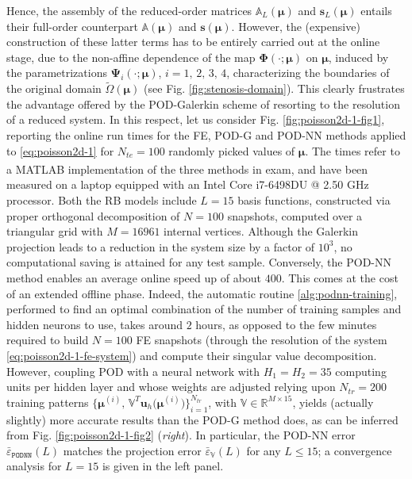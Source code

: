 \documentclass[12pt, a4paper, twoside, openright, notitlepage]{report}
\numberwithin{equation}{chapter}
\theoremstyle{theorem}
\theoremstyle{definition}
\theoremstyle{remark}
\theoremstyle{proposition}
\numberwithin{figure}{chapter}
\newcommand{\wt}[1]{\widetilde{#1}}
\newcommand{\bg}[1]{\boldsymbol{#1}}
\begin{document}
		Hence, the assembly of the reduced-order matrices $\mathbb{A}_L(\bg{\mu})$ and $\mathbf{s}_L(\bg{\mu})$ entails their full-order counterpart $\mathbb{A}(\bg{\mu})$ and $\mathbf{s}(\bg{\mu})$. However, the (expensive) construction of these latter terms has to be entirely carried out at the online stage, due to the non-affine dependence of the map $\bg{\Phi}(\cdot; \bg{\mu})$ on $\bg{\mu}$, induced by the parametrizations $\bg{\Psi}_i(\cdot; \bg{\mu})$, $i = 1, \, 2, \, 3, \, 4$, characterizing the boundaries of the original domain $\wt{\Omega}(\bg{\mu})$ (see Fig. \ref{fig:stenosis-domain}). This clearly frustrates the advantage offered by the POD-Galerkin scheme of resorting to the resolution of a reduced system. In this respect, let us consider Fig. \ref{fig:poisson2d-1-fig1}, reporting the online run times for the FE, POD-G and POD-NN methods applied to \eqref{eq:poisson2d-1} for $N_{te} = 100$ randomly picked values of $\bg{\mu}$. The times refer to a MATLAB\textsuperscript{\textregistered} implementation of the three methods in exam, and have been measured on a laptop equipped with an Intel Core i7-6498DU @ 2.50 GHz processor. Both the RB models include $L = 15$ basis functions, constructed via proper orthogonal decomposition of $N = 100$ snapshots, computed over a triangular grid with $M = 16961$ internal vertices. Although the Galerkin projection leads to a reduction in the system size by a factor of $10^3$, no computational saving is attained for any test sample. Conversely, the POD-NN method enables an average online speed up of about $400$. This comes at the cost of an extended offline phase. Indeed, the automatic routine \ref{alg:podnn-training}, performed to find an optimal combination of the number of training samples and hidden neurons to use, takes around $2$ hours, as opposed to the few minutes required to build $N = 100$ FE snapshots (through the resolution of the system \eqref{eq:poisson2d-1-fe-system}) and compute their singular value decomposition. However, coupling POD with a neural network with $H_1 = H_2 = 35$ computing units per hidden layer and whose weights are adjusted relying upon $N_{tr} = 200$ training patterns $\big\lbrace \bg{\mu}^{(i)}, \, \mathbb{V}^T \mathbf{u}_h \big( \bg{\mu}^{(i)} \big) \big\rbrace_{i = 1}^{N_{tr}}$, with $\mathbb{V} \in \mathbb{R}^{M \times 15}$, yields (actually slightly) more accurate results than the POD-G method does, as can be inferred from Fig. \ref{fig:poisson2d-1-fig2} (\emph{right}). In particular, the POD-NN error $\bar{\varepsilon}_{\texttt{PODNN}}^{}(L)$ matches the projection error $\bar{\varepsilon}_{\mathbb{V}}^{}(L)$ for any $L \leq 15$; a convergence analysis for $L = 15$ is given in the left panel.
		
\end{document}
